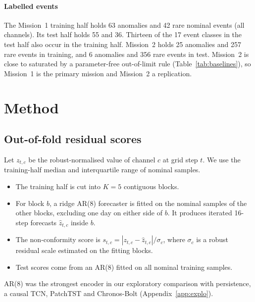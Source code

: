 \documentclass[preprint,12pt,authoryear]{elsarticle}
\begin{document}
\paragraph{Labelled events}
The Mission~1 training half holds 63 anomalies and 42 rare nominal events (all channels).
Its test half holds 55 and 36. Thirteen of the 17 event classes in the test half also occur
in the training half. Mission~2 holds 25 anomalies and 257 rare events in training, and 6
anomalies and 356 rare events in test. Mission~2 is close to saturated by a parameter-free
out-of-limit rule (Table~\ref{tab:baselines}), so Mission~1 is the primary mission and
Mission~2 a replication.

\section{Method}\label{sec:method}
\subsection{Out-of-fold residual scores}\label{sec:oof}
Let $z_{t,c}$ be the robust-normalised value of channel $c$ at grid step $t$. We use the
training-half median and interquartile range of nominal samples.
\begin{itemize}
\item The training half is cut into $K=5$ contiguous blocks.
\item For block $b$, a ridge AR(8) forecaster is fitted on the nominal samples of the other
  blocks, excluding one day on either side of $b$. It produces iterated 16-step forecasts
  $\hat z_{t,c}$ inside $b$.
\item The non-conformity score is $s_{t,c}=|z_{t,c}-\hat z_{t,c}|/\sigma_c$, where
  $\sigma_c$ is a robust residual scale estimated on the fitting blocks.
\item Test scores come from an AR(8) fitted on all nominal training samples.
\end{itemize}
AR(8) was the strongest encoder in our exploratory comparison with persistence, a causal TCN,
PatchTST \citep{nie2023patchtst} and Chronos-Bolt \citep{ansari2024chronos}
(Appendix~\ref{app:explo}).
\end{document}
